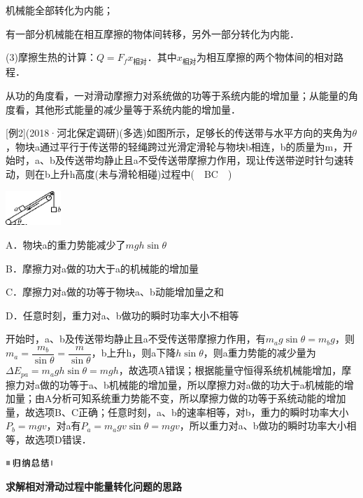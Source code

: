 机械能全部转化为内能；

有一部分机械能在相互摩擦的物体间转移，另外一部分转化为内能．

(3)摩擦生热的计算：$Q=F_fx_{\text{相对}}$．其中$x_{\text{相对}}$为相互摩擦的两个物体间的相对路程．

从功的角度看，一对滑动摩擦力对系统做的功等于系统内能的增加量；从能量的角度看，其他形式能量的减少量等于系统内能的增加量．

{[}例2{]}(2018·河北保定调研)(多选)如图所示，足够长的传送带与水平方向的夹角为$\theta$，物块a通过平行于传送带的轻绳跨过光滑定滑轮与物块b相连，b的质量为m，开始时，a、b及传送带均静止且a不受传送带摩擦力作用，现让传送带逆时针匀速转动，则在b上升h高度(未与滑轮相碰)过程中(　BC　)

\begin{center}\includegraphics[width=0.82083in,height=0.50972in]{media/image241.png}\end{center}

A．物块a的重力势能减少了$mgh\sin \theta$

B．摩擦力对a做的功大于a的机械能的增加量

C．摩擦力对a做的功等于物块a、b动能增加量之和

D．任意时刻，重力对a、b做功的瞬时功率大小不相等
\begin{solution}
	开始时，a、b及传送带均静止且a不受传送带摩擦力作用，有$m_ag\sin\theta=m_bg$，则$m_{a}=\dfrac{m_{b}}{\sin \theta}=\dfrac{m}{\sin \theta}$，b上升h，则a下降$h\sin\theta$，则a重力势能的减少量为$\Delta E_{pa}=m_agh\sin\theta=mgh$，故选项A错误；根据能量守恒得系统机械能增加，摩擦力对a做的功等于a、b机械能的增加量，所以摩擦力对a做的功大于a机械能的增加量；由A分析可知系统重力势能不变，所以摩擦力做的功等于系统动能的增加量，故选项B、C正确；任意时刻，a、b的速率相等，对b，重力的瞬时功率大小$P_b=mgv$，对a有$P_a=m_agv\sin\theta=mgv$，所以重力对a、b做功的瞬时功率大小相等，故选项D错误．
\end{solution}


\begin{center}\includegraphics[width=0.70764in,height=0.12292in]{media/image13.png}

\textbf{求解相对滑动过程中能量转化问题的思路}
\end{center}


